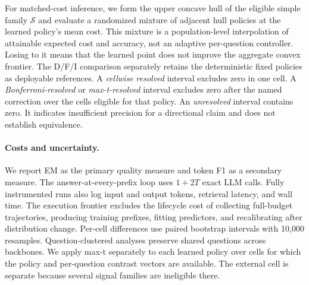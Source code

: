 For matched-cost inference, we form the upper concave hull of the eligible
simple family $\mathcal{S}$ and evaluate a randomized mixture of adjacent hull
policies at the learned policy's mean cost. This mixture is a population-level
interpolation of attainable expected cost and accuracy, not an adaptive
per-question controller. Losing to it means that the learned point does not
improve the aggregate convex frontier. The D/F/I comparison separately retains
the deterministic fixed policies as deployable references. A \emph{cellwise resolved} interval
excludes zero in one cell. A \emph{Bonferroni-resolved} or
\emph{max-t-resolved} interval excludes zero after the named correction over
the cells eligible for that policy. An
\emph{unresolved} interval contains zero. It indicates insufficient precision
for a directional claim and does not establish equivalence.

\paragraph{Costs and uncertainty.}
We report EM as the primary quality measure and token F1 as a secondary
measure. The answer-at-every-prefix loop uses $1+2T$ exact LLM calls. Fully
instrumented runs also log input and output tokens, retrieval latency, and wall
time. The execution frontier excludes the lifecycle cost of collecting
full-budget trajectories, producing training prefixes, fitting predictors, and
recalibrating after distribution change. Per-cell differences use paired bootstrap
intervals with 10{,}000 resamples. Question-clustered analyses preserve shared
questions across backbones. We apply max-t separately to each learned policy
over cells for which the policy and per-question contrast vectors are
available. The external cell is separate because several signal
families are ineligible there.
